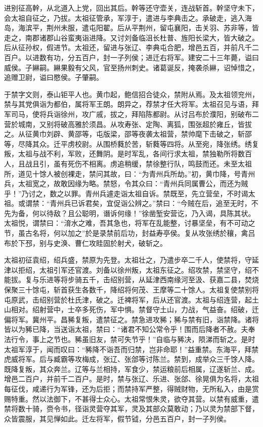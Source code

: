 \documentclass[12pt,UTF8]{ctexbook}
\begin{document}
进别征高幹，从北道入上党，回出其后。幹等还守壶关，连战斩首。幹坚守未下，会太祖自征之，乃拔。太祖征管承，军淳于，遣进与李典击之。承破走，逃入海岛，海滨平，荆州未服，遣屯阳翟。后从平荆州，留屯襄阳，击关羽、苏非等，皆走之，南郡诸郡山谷蛮夷诣进降。又讨刘备临沮长杜普、旌阳长梁大，皆大破之。后从征孙权，假进节。太祖还，留进与张辽、李典屯合肥，增邑五百，并前凡千二百户。以进数有功，分五百户，封一子列侯；进迁右将军。建安二十三年薨，谥曰威侯。子綝嗣。綝果毅有父风，官至扬州刺史。诸葛诞反，掩袭杀綝，诏悼惜之，追赠卫尉，谥曰愍侯。子肇嗣。

于禁字文则，泰山钜平人也。黄巾起，鲍信招合徒众，禁附从焉。及太祖领兖州，禁与其党俱诣为都伯，属将军王朗。朗异之，荐禁才任大将军。太祖召见与语，拜军司马，使将兵诣徐州，攻广戚，拔之，拜陷陈都尉。从讨吕布於濮阳，别破布二营於城南，又别将破高雅於须昌。从攻寿张、定陶、离狐，围张超於雍丘，皆拔之。从征黄巾刘辟、黄邵等，屯版梁，邵等夜袭太祖营，禁帅麾下击破之，斩邵等，尽降其众。迁平虏校尉。从围桥蕤於苦，斩蕤等四将。从至宛，降张绣。绣复叛，太祖与战不利，军败，还舞阴。是时军乱，各间行求太祖，禁独勒所将数百人，且战且引，虽有死伤不相离。虏追稍缓，禁徐整行队，鸣鼓而还。未至太祖所，道见十馀人被创裸走，禁问其故，曰：“为青州兵所劫。”初，黄巾降，号青州兵，太祖宽之，故敢因缘为略。禁怒，令其众曰：“青州兵同属曹公，而还为贼乎！”乃讨之，数之以罪。青州兵遽走诣太祖自诉。禁既至，先立营垒，不时谒太祖。或谓禁：“青州兵已诉君矣，宜促诣公辨之。”禁曰：“今贼在后，追至无时，不先为备，何以待敌？且公聪明，谮诉何缘！”徐凿堑安营讫，乃入谒，具陈其状。太祖悦，谓禁曰：“淯水之难，吾其急也，将军在乱能整，讨暴坚垒，有不可动之节，虽古名将，何以加之”於是录禁前后功，封益寿亭侯。复从攻张绣於穰，禽吕布於下邳，别与史涣、曹仁攻眭固於射犬，破斩之。

太祖初征袁绍，绍兵盛，禁原为先登。太祖壮之，乃遣步卒二千人，使禁将，守延津以拒绍，太祖引军还官渡。刘备以徐州叛，太祖东征之。绍攻禁，禁坚守，绍不能拔。复与乐进等将步骑五千，击绍别营，从延津西南缘河至汲、获嘉二县，焚烧保聚三十馀屯，斩首获生各数千，降绍将何茂、王摩等二十馀人。太祖复使禁别将屯原武，击绍别营於杜氏津，破之。迁裨将军，后从还官渡。太祖与绍连营，起土山相对。绍射营中，士卒多死伤，军中惧。禁督守土山，力战，气益奋。绍破，迁偏将军。冀州平。昌豨复叛，遣禁征之。禁急进攻豨；豨与禁有旧，诣禁降。诸将皆以为豨已降，当送诣太祖，禁曰：“诸君不知公常令乎！围而后降者不赦。夫奉法行令，事上之节也。豨虽旧友，禁可失节乎！”自临与豨决，陨涕而斩之。是时太祖军淳于，闻而叹曰：“豨降不诣吾而归禁，岂非命耶！”益重禁。东海平，拜禁虎威将军。后与臧霸等攻梅成，张辽、张郃等讨陈兰。禁到，成举众三千馀人降。既降复叛，其众奔兰。辽等与兰相持，军食少，禁运粮前后相属，辽遂斩兰、成。增邑二百户，并前千二百户。是时，禁与张辽、乐进、张郃、徐晃俱为名将，太祖每征伐，咸递行为军锋，还为后拒；而禁持军严整，得贼财物，无所私入，由是赏赐特重。然以法御下，不甚得士众心。太祖常恨朱灵，欲夺其营。以禁有威重，遣禁将数十骑，赍令书，径诣灵营夺其军，灵及其部众莫敢动；乃以灵为禁部下督，众皆震服，其见惮如此。迁左将军，假节钺，分邑五百户，封一子列侯。
\end{document}
